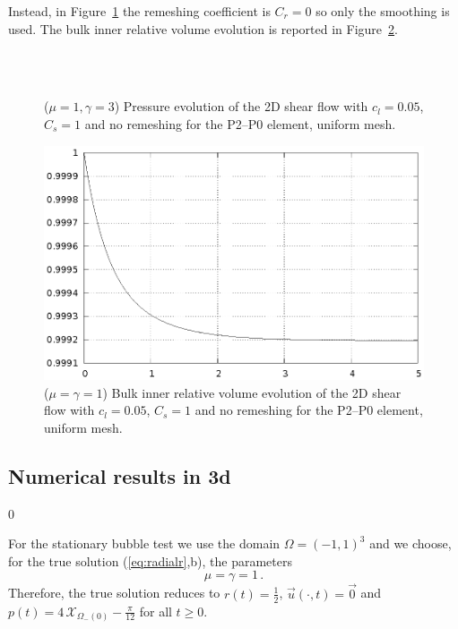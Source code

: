 \documentclass[a4paper,12pt,onecolumn]{article}
\newcommand{\bigchi}{\ensuremath{\mathrm{\mathcal{X}}}}
\newcommand{\charfcn}[1]{\bigchi_{#1}} %
\begin{document}
Instead, in Figure~\ref{fig:shear_2d_smooth} the remeshing coefficient is $C_r=0$ so only the smoothing is used. The bulk inner relative volume evolution is reported in Figure~\ref{fig:shear_2d_smooth_bulk_inner_volume}.
\begin{figure}[htbp]
  \centering
  \quad
  \\
  \quad
  \\
  \caption{($\mu=1,\gamma=3$) Pressure evolution of the 2D shear flow with $c_l=0.05$, $C_s=1$ and no remeshing for the P2--P0 element, uniform mesh.}
  \label{fig:shear_2d_smooth}
\end{figure}

\begin{figure}[htbp]
  \centering
  \includegraphics[width=.45\textwidth]{figures/2d_shear_smooth_bulk_inner_volume.ps}
  \caption{($\mu=\gamma=1$) Bulk inner relative volume evolution of the 2D shear flow with $c_l=0.05$, $C_s=1$ and no remeshing for the P2--P0 element, uniform mesh.}
  \label{fig:shear_2d_smooth_bulk_inner_volume}
\end{figure}

\subsection{Numerical results in 3d} \label{subsec:numerical_results_3d}
\setcounter{equation} 0

For the stationary bubble test we use the domain $\Omega = (-1,1)^3$ and we choose, for the true solution (\ref{eq:radialr},b), the parameters
\begin{equation*}
\mu = \gamma = 1\,. 
\end{equation*}
Therefore, the true solution reduces to $r(t) = \frac{1}{2}$, $\vec u(\cdot, t) = \vec 0$ and $p(t) = 4\,\charfcn{\Omega_-(0)} - \frac{\pi}{12}$ for all $t\geq0$.
\end{document}
